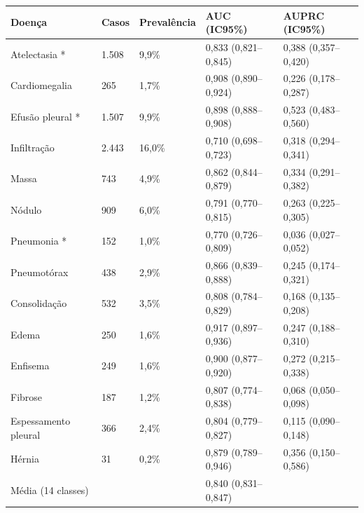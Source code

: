 \begin{tabular}{lllll}
\toprule
Doença & Casos & Prevalência & AUC (IC95\%) & AUPRC (IC95\%) \\
\midrule
Atelectasia * & 1.508 & 9,9\% & 0,833 (0,821–0,845) & 0,388 (0,357–0,420) \\
Cardiomegalia & 265 & 1,7\% & 0,908 (0,890–0,924) & 0,226 (0,178–0,287) \\
Efusão pleural * & 1.507 & 9,9\% & 0,898 (0,888–0,908) & 0,523 (0,483–0,560) \\
Infiltração & 2.443 & 16,0\% & 0,710 (0,698–0,723) & 0,318 (0,294–0,341) \\
Massa & 743 & 4,9\% & 0,862 (0,844–0,879) & 0,334 (0,291–0,382) \\
Nódulo & 909 & 6,0\% & 0,791 (0,770–0,815) & 0,263 (0,225–0,305) \\
Pneumonia * & 152 & 1,0\% & 0,770 (0,726–0,809) & 0,036 (0,027–0,052) \\
Pneumotórax & 438 & 2,9\% & 0,866 (0,839–0,888) & 0,245 (0,174–0,321) \\
Consolidação & 532 & 3,5\% & 0,808 (0,784–0,829) & 0,168 (0,135–0,208) \\
Edema & 250 & 1,6\% & 0,917 (0,897–0,936) & 0,247 (0,188–0,310) \\
Enfisema & 249 & 1,6\% & 0,900 (0,877–0,920) & 0,272 (0,215–0,338) \\
Fibrose & 187 & 1,2\% & 0,807 (0,774–0,838) & 0,068 (0,050–0,098) \\
Espessamento pleural & 366 & 2,4\% & 0,804 (0,779–0,827) & 0,115 (0,090–0,148) \\
Hérnia & 31 & 0,2\% & 0,879 (0,789–0,946) & 0,356 (0,150–0,586) \\
Média (14 classes) &  &  & 0,840 (0,831–0,847) &  \\
\bottomrule
\end{tabular}
